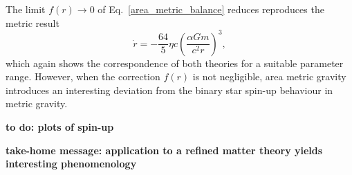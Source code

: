 The limit $f(r) \to 0$ of Eq.~\eqref{area_metric_balance} reduces reproduces the metric result
\begin{equation}
  \dot r = -\frac{64}{5} \eta c \left(\frac{\alpha Gm}{c^2r}\right)^3,
\end{equation}
which again shows the correspondence of both theories for a suitable parameter range. However, when the correction $f(r)$ is not negligible, area metric gravity introduces an interesting deviation from the binary star spin-up behaviour in metric gravity.

\textbf{to do: plots of spin-up}

\textbf{take-home message: application to a refined matter theory yields interesting phenomenology}
